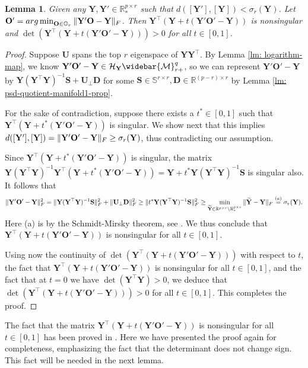 \documentclass[11pt]{article}
\newtheorem{Lemma}{Lemma}
\newcommand{\bbR}{\mathbb{R}}
\newcommand{\bbS}{\mathbb{S}}
\newcommand{\cH}{\mathcal{H}}
\newcommand{\0}{{\mathbf{0}}}
\newcommand{\1}{{\mathbf{1}}}
\newcommand{\D}{{\mathbf{D}}}
\renewcommand{\O}{{\mathbf{O}}}
\renewcommand{\S}{{\mathbf{S}}}
\newcommand{\U}{{\mathbf{U}}}
\newcommand{\Y}{{\mathbf{Y}}}
\newcommand{\cM}{{\cal M}}
\newcommand{\F}{{\rm F}}
\newcommand{\argmin}{\mathop{\rm arg\min}}
\newcommand{\bbO}{\mathbb{O}}
\newcommand{\nc}{\normalcolor}
\begin{document}
\begin{Lemma} \label{lm: positive-det}
	Given any $\Y, \Y' \in \bbR^{p \times r}_*$ such that $d([\Y'], [\Y]) < \sigma_r(\Y)$. Let $\O'  = \argmin_{\O \in \bbO_r} \| \Y' \O - \Y  \|_\F$. Then $\Y^\top (\Y + t(\Y' \O' - \Y) )$ is nonsingular and $\det(\Y^\top (\Y + t(\Y' \O' - \Y) ) ) > 0$ for all $t \in [0,1]$.
\end{Lemma}
\begin{proof} Suppose $\U$ spans the top $r$ eigenspace of $\Y \Y^\top$. By Lemma \ref{lm: logarithm-map}, we know $\Y' \O' - \Y \in \cH_\Y \widebar{\cM}_{r+}^{q}$, so we can represent $\Y' \O' - \Y$ by $\Y (\Y^\top \Y)^{-1} \S + \U_\perp \D$ for some $\S \in \bbS^{r \times r}, \D \in \bbR^{(p-r) \times r}$ by Lemma \ref{lm: psd-quotient-manifold1-prop}.

For the sake of contradiction, suppose there exists a $t^* \in [0,1]$ such that $\Y^\top (\Y + t^*(\Y' \O' - \Y))$ is singular. We show next that this implies $d([\Y'],[\Y]) = \|\Y'\O' - \Y\|_\F \geq \sigma_r(\Y)$, thus contradicting our assumption. 

Since $\Y^\top (\Y + t^*(\Y' \O' - \Y))$ is singular, the matrix $\Y (\Y^\top \Y)^{-1}\Y^\top (\Y + t^*(\Y' \O' - \Y)) = \Y + t^* \Y (\Y^\top \Y)^{-1}\S$ is singular also. It follows that
\begin{equation*}
	\begin{split}
		\|\Y'\O' - \Y\|^2_\F = \|\Y (\Y^\top \Y)^{-1} \S\|^2_\F + \|\U_\perp \D\|_\F^2 \geq \|t^*\Y (\Y^\top \Y)^{-1} \S\|^2_\F \geq \min_{\widetilde{\Y} \in \bbR^{p \times r} \setminus \bbR^{p \times r}_* }\| \widetilde{\Y} - \Y \|_\F \overset{ (a) }= \sigma_r(\Y).
	\end{split}
\end{equation*} Here (a) is by the Schmidt-Mirsky theorem, see \cite[Chapter 1, Theorem 4.32]{stewart1998matrix}. We thus conclude that $\Y^\top (\Y + t(\Y' \O' - \Y) )$ is nonsingular for all $t \in [0,1]$. 

Using now the continuity of $\det(\Y^\top (\Y + t(\Y' \O' - \Y) ) )$ with respect to $t$, the fact that $\Y^\top (\Y + t(\Y' \O' - \Y) )$ is nonsingular for all $t \in [0,1]$, and the fact that at $t = 0$ we have $\det(\Y^\top \Y) > 0$, we deduce that $\det(\Y^\top (\Y + t(\Y' \O' - \Y) ) ) > 0$ for all $t \in [0,1]$. This completes the proof.
\end{proof}


The fact that the matrix $\Y^\top (\Y + t(\Y' \O' - \Y) )$ is nonsingular for all $t \in [0,1]$ has been proved in \cite[Proposition 6.2]{massart2020quotient}. Here we have presented the proof again for completeness, emphasizing the fact that the determinant does not change sign. This fact will be needed in the next lemma.
  \nc
\end{document}
